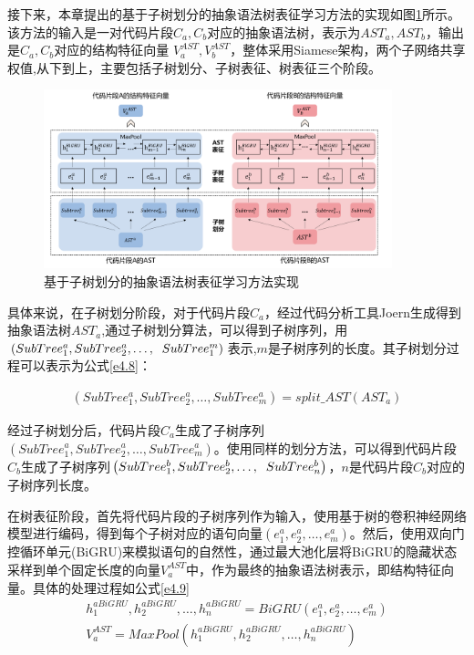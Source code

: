 接下来，本章提出的基于子树划分的抽象语法树表征学习方法的实现如图\ref{fig:ast}所示。该方法的输入是一对代码片段$C_{a},C_{b}$对应的抽象语法树，表示为$AST_{a},AST_{b}$，输出是$C_{a},C_{b}$对应的结构特征向量 $V_{a}^{AST},V_{b}^{AST}$，整体采用Siamese架构，两个子网络共享权值,从下到上，主要包括子树划分、子树表征、树表征三个阶段。

\begin{figure}[H]
  \centering
  \includegraphics[width=0.9\textwidth]{figures/ast}
  \caption{基于子树划分的抽象语法树表征学习方法实现}\label{fig:ast}
\end{figure}

具体来说，在子树划分阶段，对于代码片段$C_{a}$，经过代码分析工具Joern生成得到抽象语法树$AST_{a}$,通过子树划分算法，可以得到子树序列，用$\left(SubTree_{1}^{a},SubTree_{2}^{a},\ldots,\notag \right.\\\left.SubTree_{1}^{m}\right)$表示,$m$是子树序列的长度。其子树划分过程可以表示为公式\ref{e4.8}：

\begin{equation}\label{e4.8}
  \begin{split}
    \left(SubTree_{1}^{a},SubTree_{2}^{a},\ldots,SubTree_{m}^{a}\right) = split\_AST \left(AST_{a}\right)
  \end{split}
\end{equation}

经过子树划分后，代码片段$C_{a}$生成了子树序列$\left(SubTree_{1}^{a},SubTree_{2}^{a},\ldots,SubTree_{m}^{a}\right)$。使用同样的划分方法，可以得到代码片段$C_{b}$生成了子树序列$\left(SubTree_{1}^{b},SubTree_{2}^{b},\ldots,\notag \right.\\\left.SubTree_{n}^{b}\right)$，$n$是代码片段$C_b$对应的子树序列长度。

在树表征阶段，首先将代码片段的子树序列作为输入，使用基于树的卷积神经网络模型进行编码，得到每个子树对应的语句向量$\left( e_{1}^{a},e_{2}^{a},\ldots,e_{m}^{a}\right)$。然后，使用双向门控循环单元(BiGRU)来模拟语句的自然性，通过最大池化层将BiGRU的隐藏状态采样到单个固定长度的向量$V_{a}^{AST}$中，作为最终的抽象语法树表示，即结构特征向量。具体的处理过程如公式\ref{e4.9}
\begin{equation}\label{e4.9}
  \begin{split}
    h_{1}^{aBiGRU},h_{2}^{aBiGRU},\ldots,h_{n}^{aBiGRU} = BiGRU \left(e_{1}^{a},e_{2}^{a},\ldots,e_{m}^{a}\right) \\
    V_{a}^{AST} = MaxPool \left( h_{1}^{aBiGRU},h_{2}^{aBiGRU},\ldots,h_{n}^{aBiGRU} \right)
  \end{split}
\end{equation}

